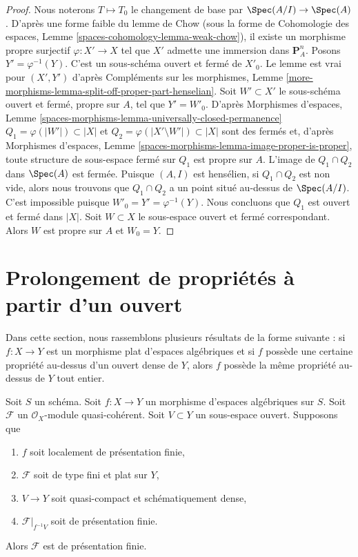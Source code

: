 \begin{proof}
Nous noterons $T \mapsto T_0$ le changement de base par
$\Spec(A/I) \to \Spec(A)$.
D'après une forme faible du lemme de Chow (sous la forme de
Cohomologie des espaces, Lemme \ref{spaces-cohomology-lemma-weak-chow}),
il existe un morphisme propre surjectif $\varphi : X' \to X$ tel
que $X'$ admette une immersion dans $\mathbf{P}^n_A$.
Posons $Y' = \varphi^{-1}(Y)$. C'est un sous-schéma ouvert et fermé
de $X'_0$. Le lemme est vrai pour $(X', Y')$ d'après
Compléments sur les morphismes, Lemme
\ref{more-morphisms-lemma-split-off-proper-part-henselian}.
Soit $W' \subset X'$ le sous-schéma ouvert et fermé, propre
sur $A$, tel que $Y' = W'_0$.
D'après Morphismes d'espaces, Lemme
\ref{spaces-morphisms-lemma-universally-closed-permanence}
$Q_1 = \varphi(|W'|) \subset |X|$ et
$Q_2 = \varphi(|X' \setminus W'|) \subset |X|$
sont des fermés et, d'après
Morphismes d'espaces, Lemme \ref{spaces-morphisms-lemma-image-proper-is-proper},
toute structure de sous-espace fermé sur $Q_1$ est propre sur $A$.
L'image de $Q_1 \cap Q_2$ dans $\Spec(A)$ est fermée.
Puisque $(A, I)$ est hensélien, si $Q_1 \cap Q_2$ est non vide, alors nous
trouvons que $Q_1 \cap Q_2$ a un point situé au-dessus de $\Spec(A/I)$.
C'est impossible puisque $W'_0 = Y' = \varphi^{-1}(Y)$.
Nous concluons que $Q_1$ est ouvert et fermé dans $|X|$.
Soit $W \subset X$ le sous-espace ouvert et fermé
correspondant. Alors $W$ est propre sur $A$ et $W_0 = Y$.
\end{proof}










\section{Prolongement de propriétés à partir d'un ouvert}
\label{section-extending-properties}

\noindent
Dans cette section, nous rassemblons plusieurs résultats de la forme suivante : si $f : X \to Y$
est un morphisme plat d'espaces algébriques et si $f$ possède une certaine propriété au-dessus
d'un ouvert dense
de $Y$, alors $f$ possède la même propriété au-dessus de $Y$ tout entier.

\begin{lemma}
\label{lemma-flat-finite-type-finitely-presented-over-dense-open}
Soit $S$ un schéma.
Soit $f : X \to Y$ un morphisme d'espaces algébriques sur $S$.
Soit $\mathcal{F}$ un $\mathcal{O}_X$-module quasi-cohérent.
Soit $V \subset Y$ un sous-espace ouvert. Supposons que
\begin{enumerate}
\item $f$ soit localement de présentation finie,
\item $\mathcal{F}$ soit de type fini et plat sur $Y$,
\item $V \to Y$ soit quasi-compact et schématiquement dense,
\item $\mathcal{F}|_{f^{-1}V}$ soit de présentation finie.
\end{enumerate}
Alors $\mathcal{F}$ est de présentation finie.
\end{lemma}


